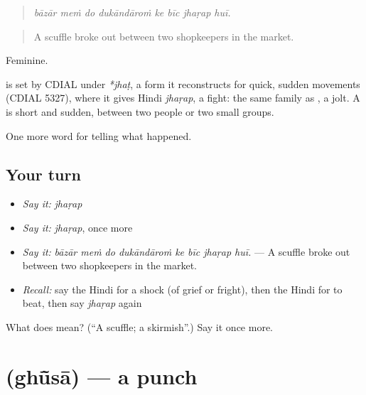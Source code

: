 \begin{quote}
       
\end{quote}

\begin{quote}
\emph{bāzār meṁ do dukāndāroṁ ke bīc jhaṛap huī.}
\end{quote}

\begin{quote}
A scuffle broke out between two shopkeepers in the market.
\end{quote}

Feminine.

\begin{cousinweb}
is set by CDIAL under \emph{*jhaṭ}, a form it reconstructs for quick, sudden movements (CDIAL 5327), where it gives Hindi \emph{jhaṛap}, a fight: the same family as \textbf{}, a jolt. A \textbf{} is short and sudden, between two people or two small groups.
\end{cousinweb}

\begin{grammarlens}[title={What you've built}]
One more word for telling what happened.
\end{grammarlens}

\subsection*{Your turn}
\begin{itemize}
\raggedright
  \item \emph{Say it:} \emph{jhaṛap}
  \item \emph{Say it:} \emph{jhaṛap}, once more
  \item \emph{Say it:} \emph{bāzār meṁ do dukāndāroṁ ke bīc jhaṛap huī.} — A scuffle broke out between two shopkeepers in the market.
  \item \emph{Recall:} say the Hindi for a shock (of grief or fright), then the Hindi for to beat, then say \emph{jhaṛap} again
\end{itemize}

\begin{tcolorbox}[breakable,colback=teal!4,colframe=teal!35!black,title={Before you move on}]
What does  mean? (\textquotedblleft{}A scuffle; a skirmish\textquotedblright{}.) Say it once more.
\end{tcolorbox}
\section[\texorpdfstring{\hi{घूँसा} (ghū̃sā)}{घूँसा (ghū̃sā)}]{ (ghū̃sā) — a punch}

